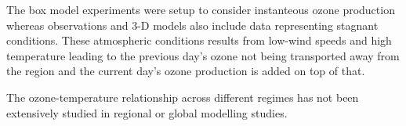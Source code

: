 The box model experiments were setup to consider instanteous ozone production whereas observations and 3-D models also include data representing stagnant conditions.
These atmospheric conditions results from low-wind speeds and high temperature leading to the previous day's ozone not being transported away from the region and the current day's ozone production is added on top of that.

The ozone-temperature relationship across different  regimes has not been extensively studied in regional or global modelling studies.
